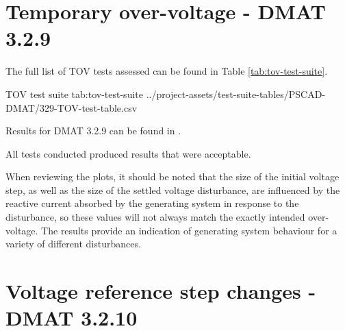 \documentclass{../grid-link-report}
\newcommand{\projectassetsdir}{../project-assets}
\begin{document}
	
	
	\section{Temporary over-voltage - DMAT 3.2.9}
	
	
	
	
	The full list of \ac{TOV} tests assessed can be found in Table \ref{tab:tov-test-suite}.
	
	{
		\fontsize{6}{8}\selectfont
		\autoscaledlongtable
		{TOV test suite}
		{tab:tov-test-suite}
		{\projectassetsdir/test-suite-tables/PSCAD-DMAT/329-TOV-test-table.csv}
	}
	
	Results for DMAT 3.2.9 can be found in .
	
	All tests conducted produced results that were acceptable. 
	
	When reviewing the plots, it should be noted that the size of the initial voltage step, as well as the size of the settled voltage disturbance, are influenced by the reactive current absorbed by the generating system in response to the disturbance, so these values will not always match the exactly intended over-voltage. The results provide an indication of generating system behaviour for a variety of different disturbances.
	
	\section{Voltage reference step changes - DMAT 3.2.10}	
	\label{sec:vref-step-changes}
	
	
	
	
	
	
\end{document}
